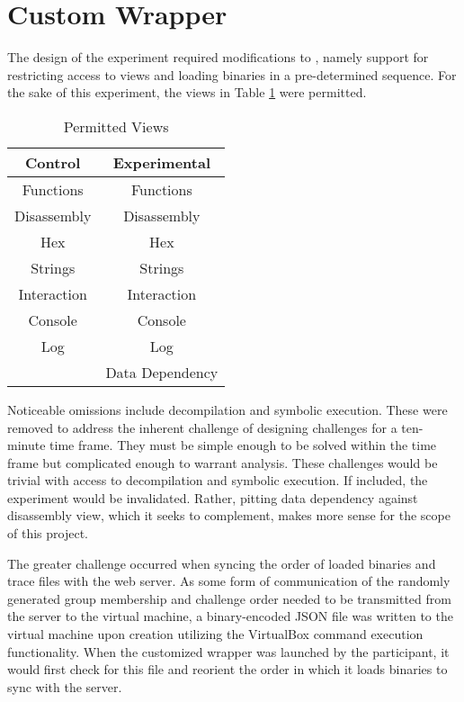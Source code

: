 \section{Custom  Wrapper}
The design of the experiment required modifications to , namely support for restricting access to views and loading binaries in a pre-determined sequence. For the sake of this experiment, the views in Table \ref{table:views} were permitted.
\begin{table}
    \begin{center}
        \caption{Permitted Views}
        \label{table:views}
        \begin{tabular}{ |c|c| }
        \hline
        \textbf{Control} & \textbf{Experimental} \\
        \hline
        Functions & Functions \\
        \hline
        Disassembly & Disassembly \\
        \hline
        Hex & Hex \\
        \hline
        Strings & Strings \\
        \hline
        Interaction & Interaction \\
        \hline
        Console & Console \\
        \hline
        Log & Log \\
        \hline
        & Data Dependency \\
        \hline
        \end{tabular}
    \end{center}
\end{table}
Noticeable omissions include decompilation and symbolic execution. These were removed to address the inherent challenge of designing challenges for a ten-minute time frame. They must be simple enough to be solved within the time frame but complicated enough to warrant analysis. These challenges would be trivial with access to decompilation and symbolic execution. If included, the experiment would be invalidated. Rather, pitting data dependency against disassembly view, which it seeks to complement, makes more sense for the scope of this project. 

The greater challenge occurred when syncing the order of loaded binaries and trace files with the web server. As some form of communication of the randomly generated group membership and challenge order needed to be transmitted from the server to the virtual machine, a binary-encoded JSON file was written to the virtual machine upon creation utilizing the VirtualBox command execution functionality. When the customized  wrapper was launched by the participant, it would first check for this file and reorient the order in which it loads binaries to sync with the server.

